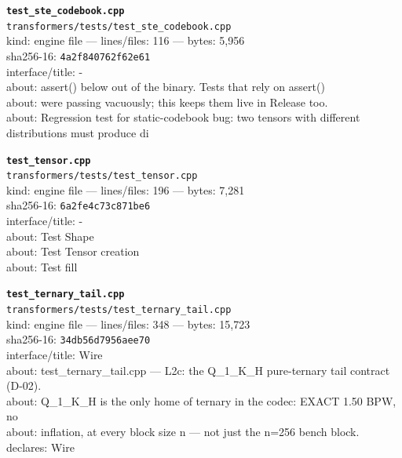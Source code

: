 \noindent\textbf{\texttt{test\_ste\_codebook.cpp}}\\
\texttt{transformers/tests/test\_ste\_codebook.cpp}\\
kind: engine file --- lines/files: 116 --- bytes: 5,956\\
sha256-16: \texttt{4a2f840762f62e61}\\
interface/title: -\\
about: assert() below out of the binary. Tests that rely on assert()\\
about: were passing vacuously; this keeps them live in Release too.\\
about: Regression test for static-codebook bug: two tensors with different distributions must produce di\\
\vspace*{6.0pt}

\noindent\textbf{\texttt{test\_tensor.cpp}}\\
\texttt{transformers/tests/test\_tensor.cpp}\\
kind: engine file --- lines/files: 196 --- bytes: 7,281\\
sha256-16: \texttt{6a2fe4c73c871be6}\\
interface/title: -\\
about: Test Shape\\
about: Test Tensor creation\\
about: Test fill\\
\vspace*{6.0pt}

\noindent\textbf{\texttt{test\_ternary\_tail.cpp}}\\
\texttt{transformers/tests/test\_ternary\_tail.cpp}\\
kind: engine file --- lines/files: 348 --- bytes: 15,723\\
sha256-16: \texttt{34db56d7956aee70}\\
interface/title: Wire\\
about: test\_ternary\_tail.cpp — L2c: the Q\_1\_K\_H pure-ternary tail contract (D-02).\\
about: Q\_1\_K\_H is the only home of ternary in the codec: EXACT 1.50 BPW, no\\
about: inflation, at every block size n — not just the n=256 bench block.\\
declares: Wire\\
\vspace*{6.0pt}

